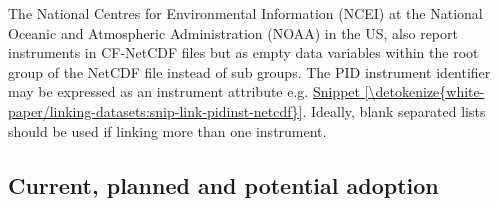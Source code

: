 \documentclass[a4paper,10pt,english]{sphinxmanual}
\begin{document}
The National Centres for Environmental Information (NCEI) at the
National Oceanic and Atmospheric Administration (NOAA) in the US, also
report instruments in CF-NetCDF files but as empty data variables within
the root group of the NetCDF file instead of sub groups. The PID
instrument identifier may be expressed as an instrument attribute e.g.
\hyperref[\detokenize{white-paper/linking-datasets:snip-link-pidinst-netcdf}]{Snippet \ref{\detokenize{white-paper/linking-datasets:snip-link-pidinst-netcdf}}}. Ideally, blank separated lists
should be used if linking more than one instrument.
\def\sphinxLiteralBlockLabel{\label{\detokenize{white-paper/linking-datasets:id10}}\label{\detokenize{white-paper/linking-datasets:snip-link-pidinst-netcdf}}}
\begin{sphinxVerbatim}[commandchars=\\\{\}]
   
        
        
        
\end{sphinxVerbatim}


\subsection{Current, planned and potential adoption}
\label{\detokenize{white-paper/adoption:current-planned-and-potential-adoption}}\label{\detokenize{white-paper/adoption::doc}}
\end{document}
